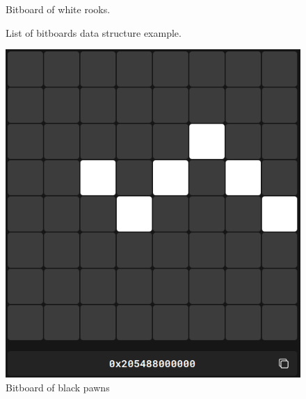 \begin{figure}[t]
\begin{minipage}[c]{0.36\textwidth}
        \caption*{Bitboard of white rooks.}
    \end{minipage}

    \caption{List of bitboards data structure example.}\label{fig:bitboardPositionExample}
\end{figure}

\begin{figure}[H]
    \centering
    \begin{minipage}[c]{0.3\textwidth}
        \centering
        \includegraphics[width=\textwidth]{Imagenes/bitboard_black_pawns.png}
        \caption*{Bitboard of black pawns}
    \end{minipage}
    \hfill
    \begin{minipage}[c]{0.3\textwidth}
        \centering

\end{minipage}
\end{figure}
